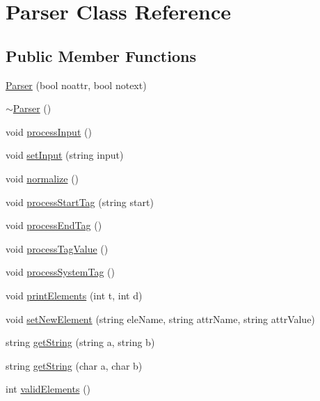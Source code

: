 \hypertarget{class_parser}{\section{Parser Class Reference}
\label{class_parser}
}
\subsection*{Public Member Functions}
\begin{DoxyCompactItemize}
\item 
\hyperlink{class_parser_accbcb0f4fb500eed8ef89cfc3e30b838}{Parser} (bool noattr, bool notext)
\item 
\hyperlink{class_parser_a3e658b5917a93a3ef648050d060e3a93}{$\sim$\-Parser} ()
\item 
void \hyperlink{class_parser_afb2443eab158312ff291f676fa50b56d}{process\-Input} ()
\item 
void \hyperlink{class_parser_a29f145268c6c19a72a91d84a5e1cc418}{set\-Input} (string input)
\item 
void \hyperlink{class_parser_a6fd7781b90f53c05e825bc2965b0ddfa}{normalize} ()
\item 
void \hyperlink{class_parser_a05d5efd804a95edb7c5cd3dae066c8ec}{process\-Start\-Tag} (string start)
\item 
void \hyperlink{class_parser_aa35f005614bc7315b0319a8e1ca354a9}{process\-End\-Tag} ()
\item 
void \hyperlink{class_parser_a54338c27e529cb1854a535b411723297}{process\-Tag\-Value} ()
\item 
void \hyperlink{class_parser_a2514f7227c33e82450a7dbb441ca6b27}{process\-System\-Tag} ()
\item 
void \hyperlink{class_parser_aaefb2b8f0af105505e5adab69697b494}{print\-Elements} (int t, int d)
\item 
void \hyperlink{class_parser_aa27871c49ec39f602dcd05530a523306}{set\-New\-Element} (string ele\-Name, string attr\-Name, string attr\-Value)
\item 
string \hyperlink{class_parser_af176dcc4603dc8639b53c15902eb0134}{get\-String} (string a, string b)
\item 
string \hyperlink{class_parser_a2f0f2c821e1723b4114678065eea7dac}{get\-String} (char a, char b)
\item 
int \hyperlink{class_parser_aca04fd991341111eca7b8321a212621b}{valid\-Elements} ()
\end{DoxyCompactItemize}


